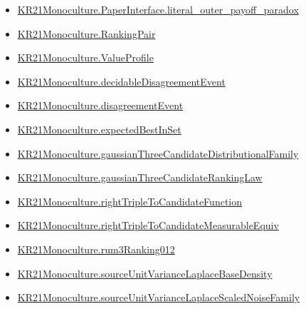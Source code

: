 \documentclass[10pt]{article}
\begin{document}
\begin{itemize}
\item \hyperlink{governing-declaration-24975e64b3c1b085}{KR21\allowbreak{}Monoculture.\allowbreak{}Paper\allowbreak{}Interface.\allowbreak{}literal\_\allowbreak{}outer\_\allowbreak{}payoff\_\allowbreak{}paradox}
\item \hyperlink{governing-declaration-90a7e19d973f51cb}{KR21\allowbreak{}Monoculture.\allowbreak{}Ranking\allowbreak{}Pair}
\item \hyperlink{paper-prerequisite-c0e41e9b0e843969}{KR21\allowbreak{}Monoculture.\allowbreak{}Value\allowbreak{}Profile}
\item \hyperlink{governing-declaration-5cbdecfd9d92e1c7}{KR21\allowbreak{}Monoculture.\allowbreak{}decidable\allowbreak{}Disagreement\allowbreak{}Event}
\item \hyperlink{governing-declaration-2d73a8643b1237e4}{KR21\allowbreak{}Monoculture.\allowbreak{}disagreement\allowbreak{}Event}
\item \hyperlink{paper-prerequisite-b8698660538f90e1}{KR21\allowbreak{}Monoculture.\allowbreak{}expected\allowbreak{}Best\allowbreak{}In\allowbreak{}Set}
\item \hyperlink{governing-declaration-0b606c41d1e36127}{KR21\allowbreak{}Monoculture.\allowbreak{}gaussian\allowbreak{}Three\allowbreak{}Candidate\allowbreak{}Distributional\allowbreak{}Family}
\item \hyperlink{governing-declaration-d8960a738ceddf8c}{KR21\allowbreak{}Monoculture.\allowbreak{}gaussian\allowbreak{}Three\allowbreak{}Candidate\allowbreak{}Ranking\allowbreak{}Law}
\item \hyperlink{governing-declaration-2b6fdd101aa94dbe}{KR21\allowbreak{}Monoculture.\allowbreak{}right\allowbreak{}Triple\allowbreak{}To\allowbreak{}Candidate\allowbreak{}Function}
\item \hyperlink{governing-declaration-a16594eefcea1af8}{KR21\allowbreak{}Monoculture.\allowbreak{}right\allowbreak{}Triple\allowbreak{}To\allowbreak{}Candidate\allowbreak{}Measurable\allowbreak{}Equiv}
\item \hyperlink{governing-declaration-4fe7a5214c00da44}{KR21\allowbreak{}Monoculture.\allowbreak{}rum3\allowbreak{}Ranking012}
\item \hyperlink{governing-declaration-033e47f627034580}{KR21\allowbreak{}Monoculture.\allowbreak{}source\allowbreak{}Unit\allowbreak{}Variance\allowbreak{}Laplace\allowbreak{}Base\allowbreak{}Density}
\item \hyperlink{governing-declaration-8f8bd92ec0df2902}{KR21\allowbreak{}Monoculture.\allowbreak{}source\allowbreak{}Unit\allowbreak{}Variance\allowbreak{}Laplace\allowbreak{}Scaled\allowbreak{}Noise\allowbreak{}Family}

\end{itemize}
\end{document}
